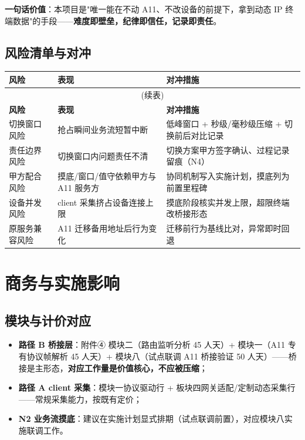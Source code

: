 \documentclass[11pt,a4paper]{ctexart}
\begin{document}
\vspace{0.5em}
\textbf{一句话价值}：本项目是"唯一能在不动 A11、不改设备的前提下，拿到动态 IP 终端数据"的手段——\textbf{难度即壁垒，纪律即信任，记录即责任}。

\subsection{风险清单与对冲}

\begin{longtable}{p{3.2cm} p{5.2cm} p{4.4cm}}
\toprule
\textbf{风险} & \textbf{表现} & \textbf{对冲措施} \\
\midrule
\endfirsthead
\multicolumn{3}{c}{(续表)} \\
\toprule
\textbf{风险} & \textbf{表现} & \textbf{对冲措施} \\
\midrule
\endhead

切换窗口风险 & 抢占瞬间业务流短暂中断 & 低峰窗口 + 秒级/毫秒级压缩 + 切换前后对比记录 \\
责任边界风险 & 切换窗口内问题责任不清 & 切换方案甲方签字确认、过程记录留痕（N4） \\
甲方配合风险 & 摸底/窗口/值守依赖甲方与 A11 服务方 & 协同机制写入实施计划，摸底列为前置里程碑 \\
设备并发风险 & client 采集挤占设备连接上限 & 摸底阶段核实并发上限，超限终端改桥接形态 \\
原服务兼容风险 & A11 迁移备用地址后行为变化 & 迁移前行为基线比对，异常即时回退 \\
\bottomrule
\end{longtable}

\section{商务与实施影响}

\subsection{模块与计价对应}

\begin{itemize}[leftmargin=*]
  \item \textbf{路径 B 桥接层}：附件④ 模块二（路由监听分析 45 人天）+ 模块一（A11 专有协议帧解析 45 人天）+ 模块八（试点联调 A11 桥接验证 50 人天）——桥接是主形态，\textbf{对应工作量是价值核心，不应被压缩}；
  \item \textbf{路径 A client 采集}：模块一协议驱动行 + 板块四网关适配/定制动态采集行——常规采集能力，按既有定价；
  \item \textbf{N2 业务流摸底}：建议在实施计划显式排期（试点联调前置），对应模块八实施联调工作。
\end{itemize}
\end{document}
